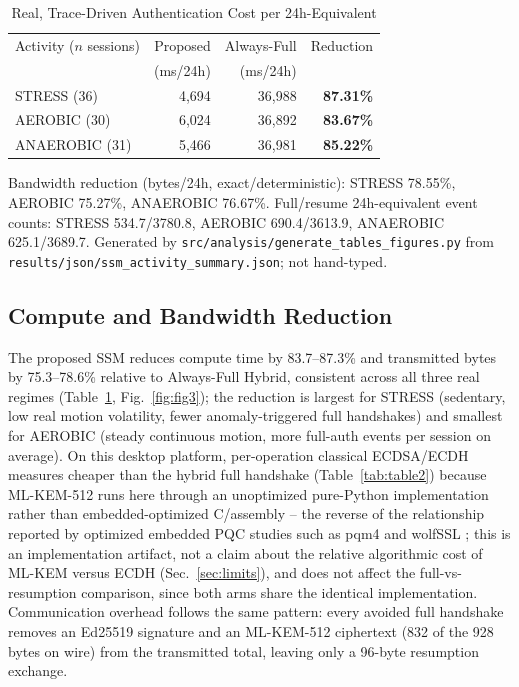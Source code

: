 \documentclass[conference]{IEEEtran}
\begin{document}
\begin{table}[t]
\caption{Real, Trace-Driven Authentication Cost per 24h-Equivalent}
\label{tab:table3}
\centering
\small
\begin{tabular}{lrrr}
\toprule
Activity ($n$ sessions) & Proposed & Always-Full & Reduction \\
 & (ms/24h) & (ms/24h) & \\
\midrule
STRESS (36) & 4{,}694 & 36{,}988 & \textbf{87.31\%} \\
AEROBIC (30) & 6{,}024 & 36{,}892 & \textbf{83.67\%} \\
ANAEROBIC (31) & 5{,}466 & 36{,}981 & \textbf{85.22\%} \\
\bottomrule
\end{tabular}

\vspace{2pt}
\footnotesize Bandwidth reduction (bytes/24h, exact/deterministic):
STRESS 78.55\%, AEROBIC 75.27\%, ANAEROBIC 76.67\%. Full/resume 24h-equivalent
event counts: STRESS 534.7/3780.8, AEROBIC 690.4/3613.9,
ANAEROBIC 625.1/3689.7. Generated by
\texttt{src/analysis/generate\_tables\_figures.py} from
\texttt{results/json/ssm\_activity\_summary.json}; not hand-typed.
\end{table}

\subsection{Compute and Bandwidth Reduction}

The proposed SSM reduces compute time by 83.7--87.3\% and transmitted
bytes by 75.3--78.6\% relative to Always-Full Hybrid, consistent across
all three real regimes (Table~\ref{tab:table3},
Fig.~\ref{fig:fig3}); the reduction is largest for STRESS (sedentary, low
real motion volatility, fewer anomaly-triggered full handshakes) and
smallest for AEROBIC (steady continuous motion, more full-auth events per
session on average). On this desktop platform, per-operation classical
ECDSA/ECDH measures cheaper than the hybrid full handshake
(Table~\ref{tab:table2}) because ML-KEM-512 runs here through an
unoptimized pure-Python implementation rather than embedded-optimized
C/assembly -- the reverse of the relationship reported by optimized
embedded PQC studies such as pqm4 and wolfSSL
\cite{pqm4,saarinen2020,wolfssl2024}; this is an implementation artifact,
not a claim about the relative algorithmic cost of ML-KEM versus ECDH
(Sec.~\ref{sec:limits}), and does not affect the full-vs-resumption
comparison, since both arms share the identical implementation.
Communication overhead follows the same pattern: every avoided full
handshake removes an Ed25519 signature and an ML-KEM-512 ciphertext (832 of
the 928 bytes on wire) from the transmitted total, leaving only a 96-byte
resumption exchange.
\end{document}
